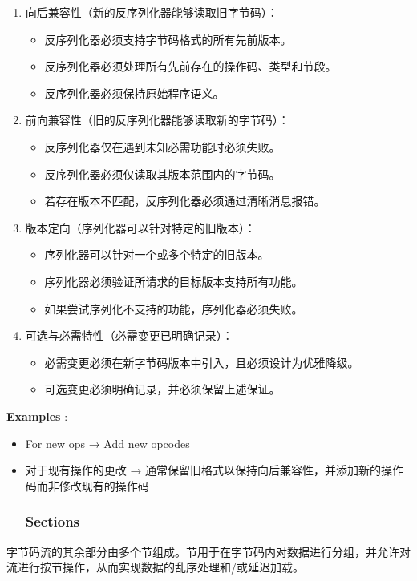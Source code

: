\documentclass{article}
\begin{document}
\begin{enumerate}
\item 向后兼容性（新的反序列化器能够读取旧字节码）：
\begin{itemize}
\item 反序列化器必须支持字节码格式的所有先前版本。
\item 反序列化器必须处理所有先前存在的操作码、类型和节段。
\item 反序列化器必须保持原始程序语义。
\end{itemize}
\item 前向兼容性（旧的反序列化器能够读取新的字节码）：
\begin{itemize}
\item 反序列化器仅在遇到未知必需功能时必须失败。
\item 反序列化器必须仅读取其版本范围内的字节码。
\item 若存在版本不匹配，反序列化器必须通过清晰消息报错。
\end{itemize}
\item 版本定向（序列化器可以针对特定的旧版本）：
\begin{itemize}
\item 序列化器可以针对一个或多个特定的旧版本。
\item 序列化器必须验证所请求的目标版本支持所有功能。
\item 如果尝试序列化不支持的功能，序列化器必须失败。
\end{itemize}
\item 可选与必需特性（必需变更已明确记录）：
\begin{itemize}
\item 必需变更必须在新字节码版本中引入，且必须设计为优雅降级。
\item 可选变更必须明确记录，并必须保留上述保证。

\end{itemize}
\end{enumerate}
\textbf{Examples} :


\begin{itemize}
\item For new ops → Add new opcodes
\item 对于现有操作的更改 → 通常保留旧格式以保持向后兼容性，并添加新的操作码而非修改现有的操作码


\subsubsection{Sections}

\end{itemize}
字节码流的其余部分由多个节组成。节用于在字节码内对数据进行分组，并允许对流进行按节操作，从而实现数据的乱序处理和/或延迟加载。
\end{document}

